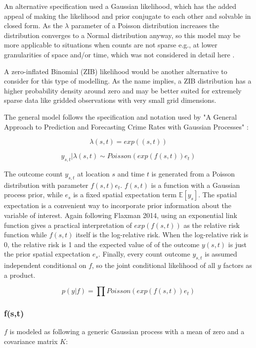 An alternative specification used a Gaussian likelihood, which has the added appeal of making the likelihood and prior conjugate to each other and solvable in closed form. As the $\lambda$ parameter of a Poisson distribution increases the distribution converges to a Normal distribution anyway, so this model may be more applicable to situations when counts are not sparse e.g., at lower granularities of space and/or time, which was not considered in detail here .

A zero-inflated Binomial (ZIB) likelihood would be another alternative to consider for this type of modelling. As the name implies, a ZIB distribution has a higher probability density around zero and may be better suited for extremely sparse data like gridded observations with very small grid dimensions.

 The general model follows the specification and notation used by "A General Approach to Prediction and Forecasting Crime Rates with Gaussian Processes" \cite{flaxman_2014}: \par


$$\lambda(s,t) = exp((s,t))$$

$$ y_{s,t} | \lambda(s,t) \sim Poisson(exp(f(s,t))e_t) $$

The outcome count $y_{s,t}$ at location $s$ and time $t$ is generated from a Poisson distribution with parameter $f(s,t)e_t$. $f(s,t)$ is a function with a Gaussian process prior, while $e_s$ is a fixed spatial expectation term $\mathbb{E}[y_s]$. The spatial expectation is a convenient way to incorporate prior information about the variable of interest. Again following Flaxman 2014, using an exponential link function gives a practical interpretation of $exp(f(s,t))$ as the relative risk function while $f(s,t)$ itself is the log-relative risk. When the log-relative risk is 0, the relative risk is 1 and the expected value of of the outcome $y(s,t)$ is just the prior spatial expectation $e_s$. Finally, every count outcome $y_{s,t}$ is assumed independent conditional on $f$, so the joint conditional likelihood of all $y$ factors as a product.

$$p(y|f) = \prod{ Poisson(exp(f(s,t))e_t)}$$

\subsubsection{f(s,t)}

$f$ is modeled as following a generic Gaussian process with a mean of zero and a covariance matrix $K$:

